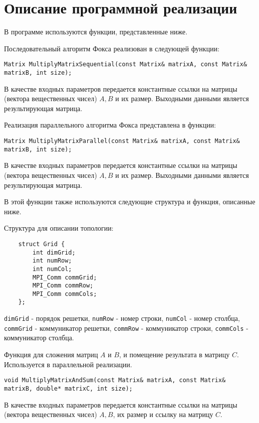\documentclass{report}
\begin{document}
\section*{Описание программной реализации}
В программе используются функции, представленные ниже.
\par Последовательный алгоритм Фокса реализован в следующей функции:
\begin{lstlisting}
Matrix MultiplyMatrixSequential(const Matrix& matrixA, const Matrix& matrixB, int size);
\end{lstlisting}
\par В качестве входных параметров передается константные ссылки на матрицы (вектора вещественных чисел) {\itshape $A, B$} и их размер. Выходными данными является результирующая матрица.
\par Реализация параллельного алгоритма Фокса представлена в функции:
\begin{lstlisting}
Matrix MultiplyMatrixParallel(const Matrix& matrixA, const Matrix& matrixB, int size);
\end{lstlisting}
\par В качестве входных параметров передается константные ссылки на матрицы (вектора вещественных чисел) {\itshape $A, B$} и их размер. Выходными данными является результирующая матрица.
\par В этой функции также используются следующие структура и функция, описанные ниже.
\par Структура для описании топологии:
\begin{lstlisting}
    struct Grid {
        int dimGrid;
        int numRow;
        int numCol;
        MPI_Comm commGrid;
        MPI_Comm commRow;
        MPI_Comm commCols;
    };
\end{lstlisting}
\par \verb|dimGrid| - порядок решетки, \verb|numRow| - номер строки, \verb|numCol| - номер столбца, \verb|commGrid| - коммуникатор решетки, \verb|commRow| - коммуникатор строки, \verb|commCols| - коммуникатор столбца.
\par Функция для сложения матриц {\itshape $A$} и {\itshape $B$}, и помещение результата в матрицу {\itshape $C$}. Используется в параллельной реализации.
\begin{lstlisting}
void MultiplyMatrixAndSum(const Matrix& matrixA, const Matrix& matrixB, double* matrixC, int size);
\end{lstlisting}
\par В качестве входных параметров передается константные ссылки на матрицы (вектора вещественных чисел) {\itshape $A, B$}, их размер и ссылку на матрицу {\itshape $C$}.
\end{document}
